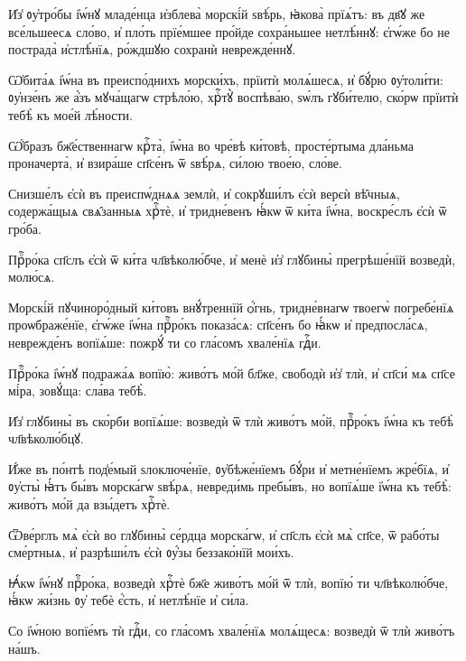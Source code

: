 \hKv И҆з̾ ᲂу҆тро́бы і҆ѡ́нꙋ младе́нца  и҆зблева̀ морскі́й ѕвѣ́рь, ꙗ҆кова̀ прїѧ́тъ: въ дв҃ꙋ же все́льшеесѧ  сло́во, и҆ пло́ть прїе́мшее про́йде сохра́ньшее нетлѣ́ннꙋ: є҆гѡ́же  бо не пострада̀ и҆стлѣ́нїѧ, ро́ждшꙋю сохранѝ неврежде́ннꙋ. 

\hKv Ѡ҆бита́ѧ і҆ѡ́на въ преиспо́днихъ морски́хъ, прїитѝ молѧ́шесѧ, и҆  бꙋ́рю ᲂу҆толи́ти: ᲂу҆нзе́нъ же а҆́зъ мꙋча́щагѡ стрѣло́ю, хрⷭ҇тꙋ̀  воспѣва́ю, ѕѡ́лъ гꙋби́телю, ско́рѡ прїитѝ тебѣ̀ къ мое́й  лѣ́ности. 
%

\hKv Ѡ҆́бразъ бж҃е́ственнагѡ крⷭ҇та̀, і҆ѡ́на во чре́вѣ  ки́товѣ, просте́ртыма дла́ньма проначерта̀, и҆ взира́ше сп҃се́нъ ѿ  ѕвѣ́рѧ, си́лою твое́ю, сло́ве. 
%

\hKv Снизше́лъ є҆сѝ въ преиспѡ́днѧѧ землѝ, и҆ сокрꙋши́лъ  є҆сѝ верєѝ вѣ̑чныѧ, содержа́щыѧ свѧ̑занныѧ хрⷭ҇тѐ, и҆  тридне́венъ  ꙗ҆́кѡ ѿ ки́та і҆ѡ́на,  воскре́слъ є҆сѝ ѿ гро́ба. 
%

\hKv Прⷪ҇ро́ка сп҃слъ є҆сѝ ѿ ки́та чл҃вѣколю́бче, и҆  менѐ и҆з̾ глꙋбины̀ прегрѣше́нїй возведѝ, молю́сѧ. 
%

\hKv Морскі́й пꙋчиноро́дный ки́товъ внꙋ́треннїй  ѻ҆́гнь, тридне́внагѡ твоегѡ̀ погребе́нїѧ проѡбраже́нїе, є҆гѡ́же  і҆ѡ́на прⷪ҇ро́къ показа́сѧ: сп҃се́нъ бо ꙗ҆́кѡ и҆ предпосла́сѧ,  неврежде́нъ вопїѧ́ше: пожрꙋ́ ти со гла́сомъ хвале́нїѧ гдⷭ҇и. 
%

\hKv Прⷪ҇ро́ка і҆ѡ́нꙋ подража́ѧ вопїю̀: живо́тъ мо́й бл҃же, свободѝ  и҆з̾ тлѝ, и҆ сп҃си́ мѧ сп҃се мі́ра, зовꙋ́ща: сла́ва тебѣ̀. 

\hKv И҆з̾ глꙋбины̀ въ ско́рби вопїѧ́ше: возведѝ ѿ тлѝ живо́тъ  мо́й, прⷪ҇ро́къ і҆ѡ́на къ тебѣ̀ чл҃вѣколю́бцꙋ. 

\hKv И҆́же въ по́нтѣ под̾е́мый ѕлоключе́нїе, ᲂу҆бѣже́нїемъ бꙋ́ри  и҆ метне́нїемъ жре́бїѧ, и҆  ᲂу҆сты̀  ꙗ҆́тъ бы́въ морска́гѡ ѕвѣ́рѧ, невреди́мь пребы́въ, но вопїѧ́ше  і҆ѡ́на къ тебѣ̀: живо́тъ мо́й да взы́детъ хрⷭ҇тѐ. 

\hKv Ѿве́рглъ мѧ̀ є҆сѝ во глꙋбины̀ се́рдца морска́гѡ, и҆ сп҃слъ  є҆сѝ мѧ̀ сп҃се, ѿ рабо́ты сме́ртныѧ, и҆ разрѣши́лъ є҆сѝ  ᲂу҆́зы беззако́нїй мои́хъ. 

\hKv Ꙗ҆́кѡ і҆ѡ́нꙋ прⷪ҇ро́ка, возведѝ хрⷭ҇тѐ бж҃е живо́тъ мо́й ѿ  тлѝ, вопїю́ ти чл҃вѣколю́бче, ꙗ҆́кѡ жи́знь ᲂу҆ тебѐ є҆́сть, и҆  нетлѣ́нїе и҆ си́ла. 

\hKv Со і҆ѡ́ною вопїе́мъ тѝ гдⷭ҇и, со гла́сомъ хвале́нїѧ молѧ́щесѧ:  возведѝ ѿ тлѝ живо́тъ на́шъ. 

